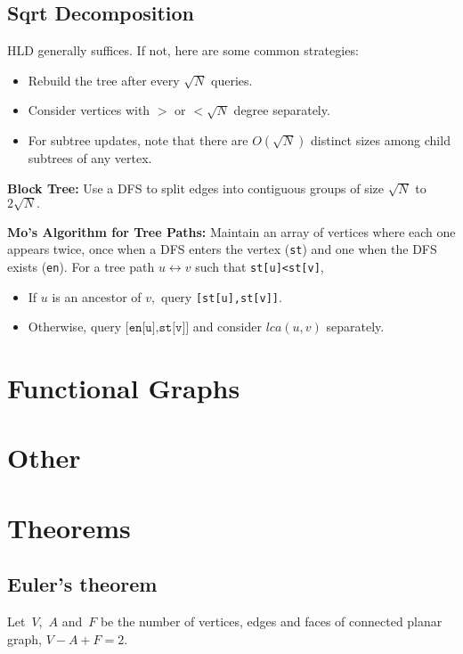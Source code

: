     \subsection{Sqrt Decomposition}
		HLD generally suffices. If not, here are some common strategies:
		\begin{itemize}
			\item Rebuild the tree after every $\sqrt N$ queries. 
			\item Consider vertices with $>$ or $<\sqrt N$ degree separately. 
			\item For subtree updates, note that there are $O(\sqrt N)$ distinct sizes among child subtrees of any vertex.
		\end{itemize}

		\textbf{Block Tree:} Use a DFS to split edges into contiguous groups of size $\sqrt N$ to $2\sqrt N.$

		\textbf{Mo's Algorithm for Tree Paths:} Maintain an array of vertices where each one appears twice, once when a DFS enters the vertex (\texttt{st}) and one when the DFS exists (\texttt{en}). For a tree path $u\leftrightarrow v$ such that \texttt{st[u]<st[v]},

		\begin{itemize}
		\item If $u$ is an ancestor of $v,$ query \texttt{[st[u],st[v]]}.
		\item Otherwise, query $\texttt{[en[u],st[v]]}$ and consider $lca(u,v)$ separately.
		\end{itemize}
    
\section{Functional Graphs}
\section{Other}

\section{Theorems}

\subsection{Euler's theorem}
Let~$V$,~$A$ and~$F$ be the number of vertices, edges and faces of connected planar graph, $V - A + F = 2$.

